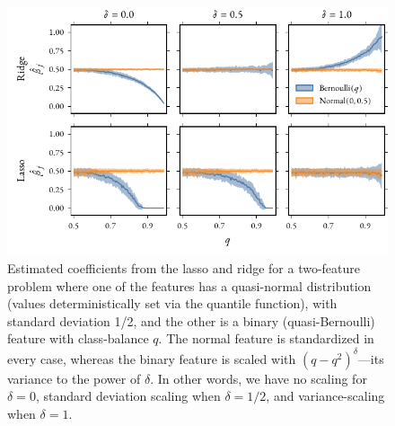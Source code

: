 \begin{figure}[htpb]
  \centering
  \includegraphics[]{figures/mixed_data_thesis.pdf}
  \caption{%
    Estimated coefficients from the lasso and ridge for a two-feature problem where one of the features has a quasi-normal distribution (values deterministically set via the quantile function), with standard deviation 1/2, and the other is a binary (quasi-Bernoulli) feature with class-balance \(q\). The normal feature is standardized in every case, whereas the binary feature is scaled with \((q - q^2)^\delta\)---its variance to the power of \(\delta\). In other words, we have no scaling for \(\delta=0\), standard deviation scaling when \(\delta=1/2\), and variance-scaling when \(\delta = 1\).
  }
  \label{fig:paper6-highlight}
\end{figure}
